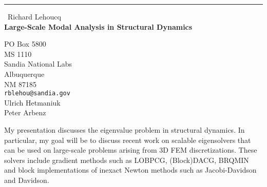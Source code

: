 \documentclass{report}
\begin{document}
\begin{center}
\rule{6in}{1pt} \
{\large Richard Lehoucq \\
{\bf Large-Scale Modal Analysis in Structural Dynamics}}

PO Box 5800 \\ MS 1110 \\ Sandia National Labs \\ Albuquerque \\ NM 87185
\\
{\tt rblehou@sandia.gov}\\
Ulrich Hetmaniuk\\
Peter Arbenz\end{center}

My presentation discusses the eigenvalue problem in structural dynamics.
In particular, my goal will be to discuss recent work on scalable
eigensolvers that can be used on large-scale problems arising from 3D FEM
discretizations. These solvers include gradient methods such as LOBPCG,
(Block)DACG, BRQMIN and block implementations of inexact Newton methods
such as Jacobi-Davidson and Davidson.
\end{document}

